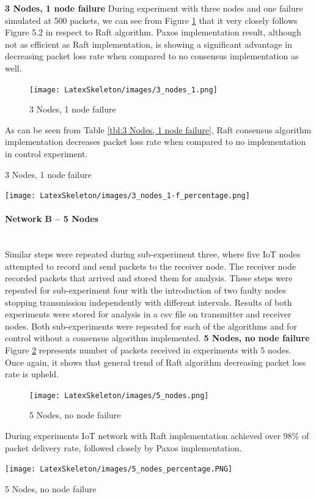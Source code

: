 \documentclass[oneside,12pt]{book}
\newcommand{\myparagraph}[1]{\paragraph{#1}\mbox{}\\}
\begin{document}
\noindent\textbf{3 Nodes, 1 node failure}\smallskip \newline
During experiment with three nodes and one failure simulated at 500 packets, we can see from Figure \ref{fig:3 Nodes, 1 node failure} that it very closely follows Figure 5.2 in respect to Raft algorithm. Paxos implementation result, although not as efficient as Raft implementation, is showing a significant advantage in decreasing packet loss rate when compared to no consensus implementation as well.
\begin{figure}[H]
    \centering
    \texttt{[image: LatexSkeleton/images/3\_nodes\_1.png]}
    \caption{3 Nodes, 1 node failure}\label{fig:3 Nodes, 1 node failure}
\end{figure}
\noindent As can be seen from Table \ref{tbl:3 Nodes, 1 node failure}, Raft consensus algorithm implementation decreases packet loss rate when compared to no implementation in control experiment.
\begin{table}[H]
  \centering
  \caption{3 Nodes, 1 node failure}
  \label{tbl:3 Nodes, 1 node failure}
  \texttt{[image: LatexSkeleton/images/3\_nodes\_1-f\_percentage.png]}
\end{table}
\myparagraph{Network B – 5 Nodes}
Similar steps were repeated during sub-experiment three, where five IoT nodes attempted to record and send packets to the receiver node.  The receiver node recorded packets that arrived and stored them for analysis. These steps were repeated for sub-experiment four with the introduction of two faulty nodes stopping transmission independently with different intervals. Results of both experiments were stored for analysis in a csv file on transmitter and receiver nodes. Both sub-experiments were repeated for each of the algorithms and for control without a consensus algorithm implemented. 
\noindent\textbf{5 Nodes, no node failure}\smallskip \newline
Figure \ref{fig:5 Nodes, no node failure} represents number of packets received in experiments with 5 nodes. Once again, it shows that general trend of Raft algorithm decreasing packet loss rate is upheld. 
\begin{figure}[H]
    \centering
    \texttt{[image: LatexSkeleton/images/5\_nodes.png]}
    \caption{5 Nodes, no node failure}\label{fig:5 Nodes, no node failure}
\end{figure}
\noindent During experiments IoT network with Raft implementation achieved over 98\% of packet delivery rate, followed closely by Paxos implementation.
\begin{table}[H]
  \centering
  \label{tbl:5 Nodes, no node failure}
  \texttt{[image: LatexSkeleton/images/5\_nodes\_percentage.PNG]}
  \caption{5 Nodes, no node failure}
\end{table}
\end{document}

